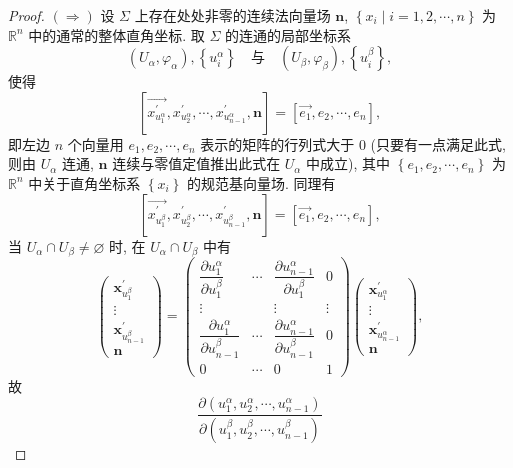 \begin{proof}
$(\Rightarrow)$ 设 $\Sigma$ 上存在处处非零的连续法向量场 $\boldsymbol{n}$, $\left\{x_{i} \mid i=1,2, \cdots, n\right\}$ 为 $\mathbb{R}^{n}$ 中的通常的整体直角坐标. 取 $\Sigma$ 的连通的局部坐标系
\[
  \left(U_{\alpha}, \varphi_{\alpha}\right),\left\{u_{i}^{\alpha}\right\} \quad \text{与} \quad\left(U_{\beta}, \varphi_{\beta}\right),\left\{u_{i}^{\beta}\right\},
\]
使得
\[
  \left[\overrightarrow{x_{u_{1}^{\alpha}}^{\prime}}, x_{u_{2}^{\alpha}}^{\prime}, \cdots, x_{u_{n-1}^{\alpha}}^{\prime}, \boldsymbol{n}\right]=\left[\overrightarrow{e_{1}}, e_{2}, \cdots, e_{n}\right],
\]
即左边 $n$ 个向量用 $e_{1}, e_{2}, \cdots, e_{n}$ 表示的矩阵的行列式大于 0 (只要有一点满足此式, 则由 $U_{\alpha}$ 连通, $\boldsymbol{n}$ 连续与零值定值推出此式在 $U_{\alpha}$ 中成立), 其中 $\left\{e_{1}, e_{2}, \cdots, e_{n}\right\}$ 为 $\mathbb{R}^{n}$ 中关于直角坐标系 $\left\{x_{i}\right\}$ 的规范基向量场. 同理有
\[
  \left[\overrightarrow{x_{u_{1}^{\beta}}^{\prime}}, x_{u_{2}^{\beta}}^{\prime}, \cdots, x_{u_{n-1}^{\beta}}^{\prime}, \boldsymbol{n}\right]=\left[\overrightarrow{e_{1}}, e_{2}, \cdots, e_{n}\right],
\]
当 $U_{\alpha} \cap U_{\beta} \neq \varnothing$ 时, 在 $U_{\alpha} \cap U_{\beta}$ 中有
\[
  \begin{pmatrix}
    \boldsymbol{x}_{u_{1}^{\beta}}^{\prime} \\
    \vdots \\
    \boldsymbol{x}_{u_{n-1}^{\beta}}^{\prime} \\
    \boldsymbol{n}
  \end{pmatrix}
  =\begin{pmatrix}
    \dfrac{\partial u_{1}^{\alpha}}{\partial u_{1}^{\beta}} & \cdots & \dfrac{\partial u_{n-1}^{\alpha}}{\partial u_{1}^{\beta}} & 0 \\
    \vdots & & \vdots & \vdots \\
    \dfrac{\partial u_{1}^{\alpha}}{\partial u_{n-1}^{\beta}} & \cdots & \dfrac{\partial u_{n-1}^{\alpha}}{\partial u_{n-1}^{\beta}} & 0 \\
    0 & \cdots & 0 & 1
  \end{pmatrix}
  \begin{pmatrix}
    \boldsymbol{x}_{u_{1}^{\alpha}}^{\prime} \\
    \vdots \\
    \boldsymbol{x}_{u_{n-1}^{\alpha}}^{\prime} \\
    \boldsymbol{n}
  \end{pmatrix},
\]
故
\[
  \frac{\partial\left(u_{1}^{\alpha}, u_{2}^{\alpha}, \cdots, u_{n-1}^{\alpha}\right)}{\partial\left(u_{1}^{\beta}, u_{2}^{\beta}, \cdots, u_{n-1}^{\beta}\right)}
\]
\end{proof}
